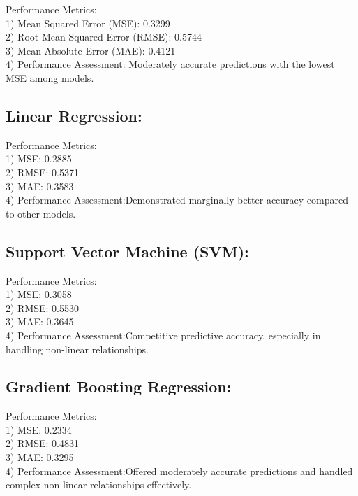 \documentclass[
]{article}
\begin{document}
Performance Metrics:\\
1) Mean Squared Error (MSE): 0.3299\\
2) Root Mean Squared Error (RMSE): 0.5744\\
3) Mean Absolute Error (MAE): 0.4121\\
4) Performance Assessment: Moderately accurate predictions with the
lowest MSE among models.

\hypertarget{linear-regression}{%
\subsection{Linear Regression:}\label{linear-regression}}

Performance Metrics:\\
1) MSE: 0.2885\\
2) RMSE: 0.5371\\
3) MAE: 0.3583\\
4) Performance Assessment:Demonstrated marginally better accuracy
compared to other models.

\hypertarget{support-vector-machine-svm}{%
\subsection{Support Vector Machine
(SVM):}\label{support-vector-machine-svm}}

Performance Metrics:\\
1) MSE: 0.3058\\
2) RMSE: 0.5530\\
3) MAE: 0.3645\\
4) Performance Assessment:Competitive predictive accuracy, especially in
handling non-linear relationships.

\hypertarget{gradient-boosting-regression}{%
\subsection{Gradient Boosting
Regression:}\label{gradient-boosting-regression}}

Performance Metrics:\\
1) MSE: 0.2334\\
2) RMSE: 0.4831\\
3) MAE: 0.3295\\
4) Performance Assessment:Offered moderately accurate predictions and
handled complex non-linear relationships effectively.
\end{document}
